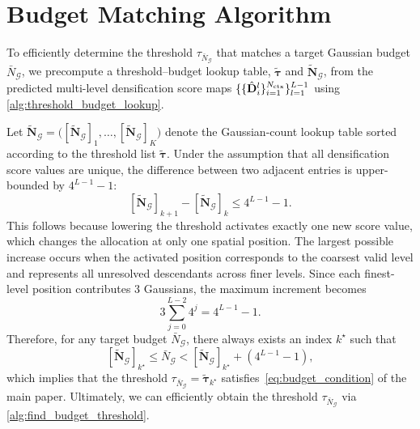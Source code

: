 \section{Budget Matching Algorithm}
To efficiently determine the threshold $\tau_{\bar{N}_\mathcal{G}}$ that matches a target Gaussian budget $\bar{N}_\mathcal{G}$, we precompute a threshold--budget lookup table, $\tilde{\boldsymbol{\tau}}$ and $\tilde{\mathbf{N}}_\mathcal{G}$, from the predicted multi-level densification score maps $\{\{\hat{\mathbf{D}}_i^l\}_{i=1}^{N_{\text{ctx}}}\}_{l=1}^{L-1}$ using \cref{alg:threshold_budget_lookup}. 


Let $\tilde{\mathbf{N}}_\mathcal{G} = \big([\tilde{\mathbf{N}}_\mathcal{G}]_1,\dots,[\tilde{\mathbf{N}}_\mathcal{G}]_K\big)$
denote the Gaussian-count lookup table sorted according to the threshold list
$\tilde{\boldsymbol{\tau}}$. Under the assumption that all densification score values are unique,
the difference between two adjacent entries is upper-bounded by $4^{L-1}-1$:
\[
[\tilde{\mathbf{N}}_\mathcal{G}]_{k+1} - [\tilde{\mathbf{N}}_\mathcal{G}]_{k} \le 4^{L-1}-1.
\]
This follows because lowering the threshold activates exactly one new score value, which changes the allocation at only one spatial position. The largest possible increase occurs when the activated position corresponds to the coarsest valid level and represents all unresolved descendants across finer levels. Since each finest-level position contributes $3$ Gaussians, the maximum increment becomes
\[
3\sum_{j=0}^{L-2}4^j = 4^{L-1}-1.
\]
Therefore, for any target budget $\bar{N}_\mathcal{G}$, there always exists an index $k^\star$ such that
\[
[\tilde{\mathbf{N}}_{\mathcal{G}}]_{k^\star} \le \bar{N}_\mathcal{G}
< [\tilde{\mathbf{N}}_{\mathcal{G}}]_{k^\star} + (4^{L-1}-1),
\]
which implies that the threshold $\tau_{\bar{N}_\mathcal{G}}=\tilde{\boldsymbol{\tau}}_{k^\star}$ satisfies~\cref{eq:budget_condition} of the main paper.
Ultimately, we can efficiently obtain the threshold $\tau_{\bar{N}_\mathcal{G}}$ via \cref{alg:find_budget_threshold}.
